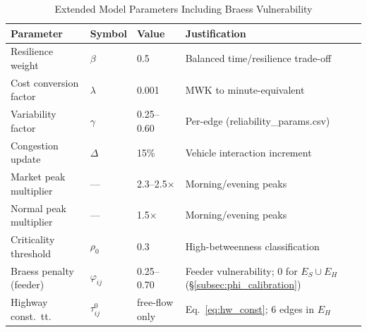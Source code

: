 \begin{table}[H]
  \centering
  \caption{Extended Model Parameters Including Braess Vulnerability}
  \label{tab:params_ext}
  \begin{tabular}{llll}
    \hline
    \textbf{Parameter} & \textbf{Symbol} & \textbf{Value}
                       & \textbf{Justification} \\
    \hline
    Resilience weight        & $\beta$           & 0.5
      & Balanced time/resilience trade-off \cite{6,11} \\
    Cost conversion factor   & $\lambda$         & 0.001
      & MWK to minute-equivalent \cite{tirkolaee2020} \\
    Variability factor       & $\gamma$          & 0.25--0.60
      & Per-edge (reliability\_params.csv) \\
    Congestion update        & $\Delta$          & 15\%
      & Vehicle interaction increment \cite{luan2024} \\
    Market peak multiplier   & ---               & 2.3--2.5$\times$
      & Morning/evening peaks \cite{8,9} \\
    Normal peak multiplier   & ---               & 1.5$\times$
      & Morning/evening peaks \cite{13} \\
    Criticality threshold    & $\rho_0$          & 0.3
      & High-betweenness classification \cite{11} \\
    Braess penalty (feeder)  & $\varphi_{ij}$    & 0.25--0.70
      & Feeder vulnerability; 0 for $E_S\cup E_H$
        (\S\ref{subsec:phi_calibration}) \\
    Highway const.\ tt.      & $\tau_{ij}^0$     & free-flow only
      & Eq.~\eqref{eq:hw_const}; 6 edges in $E_H$ \\
    \hline
  \end{tabular}
\end{table}

%
